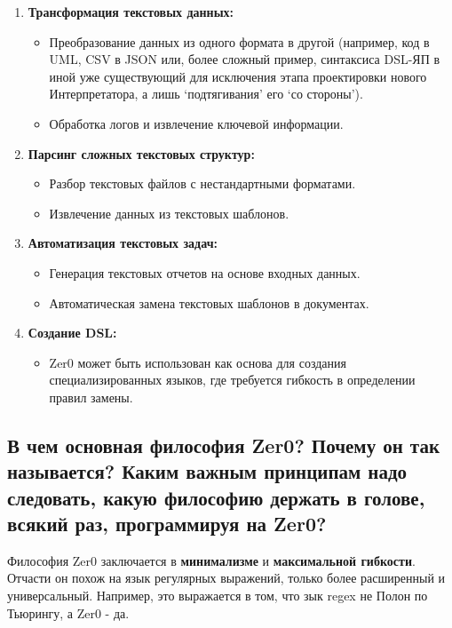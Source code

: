 \documentclass{book}
\begin{document}
\begin{enumerate}

\item \textbf{Трансформация текстовых данных:}
\begin{itemize}
\item Преобразование данных из одного формата в другой (например, код в UML, CSV в JSON или, более сложный пример, синтаксиса DSL-ЯП в иной уже существующий для исключения этапа проектировки нового Интерпретатора, а лишь `подтягивания' его `со стороны').
\item Обработка логов и извлечение ключевой информации.
\end{itemize}

\item \textbf{Парсинг сложных текстовых структур:}
\begin{itemize}
\item Разбор текстовых файлов с нестандартными форматами.
\item Извлечение данных из текстовых шаблонов.
\end{itemize}

\item \textbf{Автоматизация текстовых задач:}
\begin{itemize}
\item Генерация текстовых отчетов на основе входных данных.
\item Автоматическая замена текстовых шаблонов в документах.
\end{itemize}

\item \textbf{Создание DSL:}
\begin{itemize}
\item Zer0 может быть использован как основа для создания специализированных языков, где требуется гибкость в определении правил замены.
\end{itemize}

\end{enumerate}

\subsection{В чем основная философия Zer0? Почему он так называется? Каким важным принципам надо следовать, какую философию держать в голове, всякий раз, программируя на Zer0?}

Философия Zer0 заключается в \textbf{минимализме} и \textbf{максимальной гибкости}. Отчасти он похож на язык регулярных выражений, только более расширенный и универсальный. Например, это выражается в том, что зык regex не Полон по Тьюрингу, а Zer0 - да.
\end{document}
